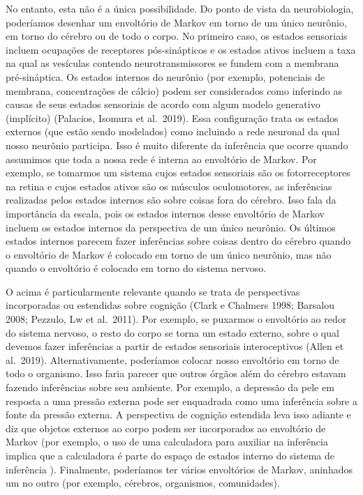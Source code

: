 \documentclass[
  12pt,
]{book}
\begin{document}
No entanto, esta não é a única possibilidade. Do ponto de vista da neurobiologia, poderíamos desenhar um envoltório de Markov em torno de um único neurônio, em torno do cérebro ou de todo o corpo. No primeiro caso, os estados sensoriais incluem ocupações de receptores pós-sinápticos e os estados ativos incluem a taxa na qual as vesículas contendo neurotransmissores se fundem com a membrana pré-sináptica. Os estados internos do neurônio (por exemplo, potenciais de membrana, concentrações de cálcio) podem ser considerados como inferindo as causas de seus estados sensoriais de acordo com algum modelo generativo (implícito) (Palacios, Isomura et al.~2019). Essa configuração trata os estados externos (que estão sendo modelados) como incluindo a rede neuronal da qual nosso neurônio participa. Isso é muito diferente da inferência que ocorre quando assumimos que toda a nossa rede é interna ao envoltório de Markov. Por exemplo, se tomarmos um sistema cujos estados sensoriais são os fotorreceptores na retina e cujos estados ativos são os músculos oculomotores, as inferências realizadas pelos estados internos são sobre coisas fora do cérebro. Isso fala da importância da escala, pois os estados internos desse envoltório de Markov incluem os estados internos da perspectiva de um único neurônio. Os últimos estados internos parecem fazer inferências sobre coisas dentro do cérebro quando o envoltório de Markov é colocado em torno de um único neurônio, mas não quando o envoltório é colocado em torno do sistema nervoso.

O acima é particularmente relevante quando se trata de perspectivas incorporadas ou estendidas sobre cognição (Clark e Chalmers 1998; Barsalou 2008; Pezzulo, Lw et al.~2011). Por exemplo, se puxarmos o envoltório ao redor do sistema nervoso, o resto do corpo se torna um estado externo, sobre o qual devemos fazer inferências a partir de estados sensoriais interoceptivos (Allen et al.~2019). Alternativamente, poderíamos colocar nosso envoltório em torno de todo o organismo. Isso faria parecer que outros órgãos além do cérebro estavam fazendo inferências sobre seu ambiente. Por exemplo, a depressão da pele em resposta a uma pressão externa pode ser enquadrada como uma inferência sobre a fonte da pressão externa. A perspectiva de cognição estendida leva isso adiante e diz que objetos externos ao corpo podem ser incorporados ao envoltório de Markov (por exemplo, o uso de uma calculadora para auxiliar na inferência implica que a calculadora é parte do espaço de estados interno do sistema de inferência ). Finalmente, poderíamos ter vários envoltórios de Markov, aninhados um no outro (por exemplo, cérebros, organismos, comunidades).
\end{document}
